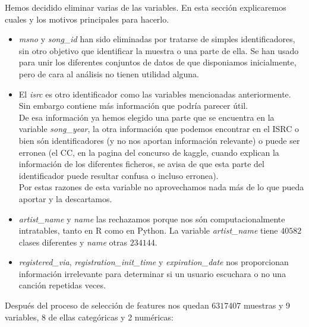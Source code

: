 \documentclass[a4paper]{article}
\begin{document}
Hemos decidido eliminar varias de las variables. En esta sección explicaremos cuales y los motivos principales para hacerlo.
\begin{itemize}
\item \textit{msno} y \textit{song\_id} han sido eliminadas por tratarse de simples identificadores, sin otro objetivo que identificar la muestra o una parte de ella. Se han usado para unir los diferentes conjuntos de datos de que disponiamos inicialmente, pero de cara al análisis no tienen utilidad alguna.
\item El \textit{isrc} es otro identificador como las variables mencionadas anteriormente. Sin embargo contiene más información que podría parecer útil.\\
De esa información ya hemos elegido una parte que se encuentra en la variable \textit{song\_year}, la otra información que podemos encontrar en el ISRC o bien són identificadores (y no nos aportan información relevante) o puede ser erronea (el CC, en la pagina del concurso de kaggle, cuando explican la información de los diferentes ficheros, se avisa de que esta parte del identificador puede resultar confusa o incluso erronea).\\
Por estas razones de esta variable no aprovechamos nada más de lo que pueda aportar y la descartamos.
\item \textit{artist\_name} y \textit{name} las rechazamos porque nos són computacionalmente intratables, tanto en R como en Python. La variable \textit{artist\_name} tiene $40582$ clases diferentes y \textit{name} otras $234144$.
\item \textit{registered\_via}, \textit{registration\_init\_time} y \textit{expiration\_date} nos proporcionan información irrelevante para determinar si un usuario escuchara o no una canción repetidas veces.
\end{itemize}

Después del proceso de selección de features nos quedan $6317407$ muestras y 9 variables, 8 de ellas categóricas y 2 numéricas:
\end{document}
